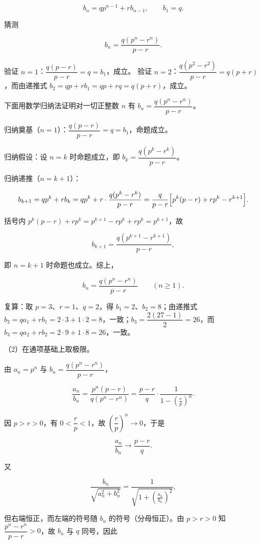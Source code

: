 \begin{answer}
\nopagebreak[4]
\[
b_n=qp^{n-1}+rb_{n-1},\qquad b_1=q.
\]

猜测

\nopagebreak[4]
\[
b_n=\frac{q(p^n-r^n)}{p-r}.
\]

验证 $n=1$：$\dfrac{q(p-r)}{p-r}=q=b_1$，成立。
验证 $n=2$：$\dfrac{q(p^2-r^2)}{p-r}=q(p+r)$，而由递推式 $b_2=qp+rb_1=qp+rq=q(p+r)$，成立。

下面用数学归纳法证明对一切正整数 $n$ 有 $b_n=\dfrac{q(p^n-r^n)}{p-r}$。

归纳奠基（$n=1$）：$\dfrac{q(p-r)}{p-r}=q=b_1$，命题成立。

归纳假设：设 $n=k$ 时命题成立，即 $b_k=\dfrac{q(p^k-r^k)}{p-r}$。

归纳递推（$n=k+1$）：

\nopagebreak[4]
\[
b_{k+1}=qp^{k}+rb_k
=qp^{k}+r\cdot\frac{q(p^k-r^k)}{p-r}
=\frac{q}{p-r}\Bigl[p^{k}(p-r)+rp^{k}-r^{k+1}\Bigr].
\]

括号内 $p^{k}(p-r)+rp^{k}=p^{k+1}-rp^{k}+rp^{k}=p^{k+1}$，故

\nopagebreak[4]
\[
b_{k+1}=\frac{q(p^{k+1}-r^{k+1})}{p-r},
\]

即 $n=k+1$ 时命题也成立。综上，

\nopagebreak[4]
\[
b_n=\frac{q(p^n-r^n)}{p-r}\qquad(n\geqslant1).
\]

复算：取 $p=3$、$r=1$、$q=2$，得 $b_1=2$、$b_2=8$；由递推式 $b_2=qa_1+rb_1=2\cdot3+1\cdot2=8$，一致；$b_3=\dfrac{2(27-1)}{2}=26$，而 $b_3=qa_2+rb_2=2\cdot9+1\cdot8=26$，一致。

（2）在通项基础上取极限。

由 $a_n=p^n$ 与 $b_n=\dfrac{q(p^n-r^n)}{p-r}$，

\nopagebreak[4]
\[
\frac{a_n}{b_n}=\frac{p^n(p-r)}{q(p^n-r^n)}=\frac{p-r}{q}\cdot\frac{1}{1-\left(\frac rp\right)^n}.
\]

因 $p>r>0$，有 $0<\dfrac rp<1$，故 $\left(\dfrac rp\right)^n\to0$，于是

\nopagebreak[4]
\[
\frac{a_n}{b_n}\to\frac{p-r}{q}.
\]

又

\nopagebreak[4]
\[
\frac{b_n}{\sqrt{a_n^2+b_n^2}}=\frac{1}{\sqrt{1+\left(\frac{a_n}{b_n}\right)^2}},
\]

但右端恒正，而左端的符号随 $b_n$ 的符号（分母恒正）。由 $p>r>0$ 知 $\dfrac{p^n-r^n}{p-r}>0$，故 $b_n$ 与 $q$ 同号，因此


\end{answer}
